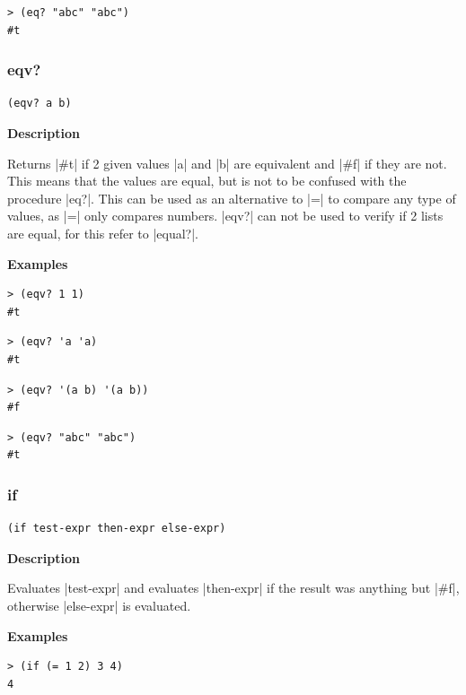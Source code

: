 \documentclass[a4paper]{article}
\begin{document}
\begin{lstlisting}
> (eq? "abc" "abc")
#t
\end{lstlisting}


\subsubsection{eqv?}

\begin{lstlisting}[frame=none]
(eqv? a b)
\end{lstlisting}

\textbf{Description}

Returns |#t| if 2 given values |a| and |b| are equivalent and |#f| if they are not. This means that the values are equal, but is not to be confused with the procedure |eq?|. This can be used as an alternative to |=| to compare any type of values, as |=| only compares numbers. |eqv?| can not be used to verify if 2 lists are equal, for this refer to |equal?|.

\textbf{Examples}

\begin{lstlisting}
> (eqv? 1 1)
#t
\end{lstlisting}

\begin{lstlisting}
> (eqv? 'a 'a)
#t
\end{lstlisting}

\begin{lstlisting}
> (eqv? '(a b) '(a b))
#f
\end{lstlisting}

\begin{lstlisting}
> (eqv? "abc" "abc")
#t
\end{lstlisting}

\subsubsection{if}

\begin{lstlisting}[frame=none]
(if test-expr then-expr else-expr)
\end{lstlisting}

\textbf{Description}

Evaluates |test-expr| and evaluates |then-expr| if the result was anything but |#f|, otherwise |else-expr| is evaluated.

\textbf{Examples}

\begin{lstlisting}
> (if (= 1 2) 3 4)
4
\end{lstlisting}
\end{document}
